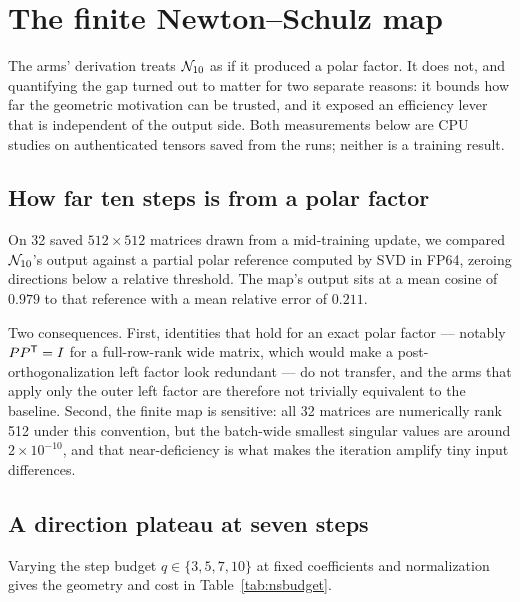 \section{The finite Newton--Schulz map}
\label{app:numerics}

The arms' derivation treats $\mathcal{N}_{10}$ as if it produced a polar factor. It does
not, and quantifying the gap turned out to matter for two separate reasons: it
bounds how far the geometric motivation can be trusted, and it exposed an
efficiency lever that is independent of the output side. Both measurements below
are CPU studies on authenticated tensors saved from the runs; neither is a
training result.

\subsection{How far ten steps is from a polar factor}

On 32 saved $512\times512$ matrices drawn from a mid-training update, we
compared $\mathcal{N}_{10}$'s output against a partial polar reference computed by SVD in
FP64, zeroing directions below a relative threshold. The map's output sits at a
mean cosine of $0.979$ to that reference with a mean relative error of $0.211$.

Two consequences. First, identities that hold for an exact polar factor ---
notably $PP^{{\mathsf T}}=I$ for a full-row-rank wide matrix, which would make a
post-orthogonalization left factor look redundant --- do not transfer, and the
arms that apply only the outer left factor are therefore not trivially
equivalent to the baseline. Second, the finite map is sensitive: all 32
matrices are numerically rank 512 under this convention, but the batch-wide
smallest singular values are around $2\times10^{-10}$, and that
near-deficiency is what makes the iteration amplify tiny input differences.

\subsection{A direction plateau at seven steps}

Varying the step budget $q\in\{3,5,7,10\}$ at fixed coefficients and
normalization gives the geometry and cost in Table~\ref{tab:nsbudget}.

